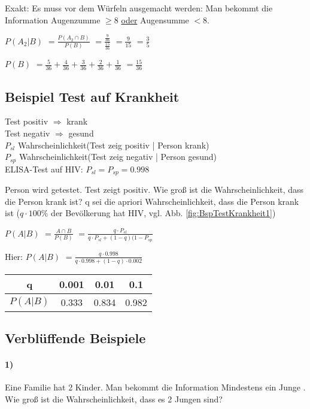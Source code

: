 Exakt: Es muss vor dem Würfeln ausgemacht werden: Man bekommt die Information Augenzumme $\geq 8$ \underline{oder} Augensumme $< 8$. 

$P(A_2|B)$
$=\frac{P(A_2\cap B)}{P(B)}$
$=\frac{\frac{9}{36}}{\frac{15}{36}}$
$=\frac{9}{15}$
$=\frac{3}{5}$

$P(B)$
$=\frac{5}{36} + \frac{4}{36} + \frac{3}{36} + \frac{2}{36} + \frac{1}{36} $
$=\frac{15}{36}$

\subsection{Beispiel Test auf Krankheit}
Test positiv $\Rightarrow$ krank\\
Test negativ $\Rightarrow$ gesund\\
$P_{sl}$ Wahrscheinlichkeit(Test zeig positiv | Person krank)\\
$P_{sp}$ Wahrscheinlichkeit(Test zeig negativ | Person gesund)\\

ELISA-Test auf HIV: $P_{sl} = P_{sp} = 0.998$

Person wird getestet. Test zeigt positiv. Wie groß ist die Wahrscheinlichkeit, dass die Person krank ist? q sei die apriori Wahrscheinlichkeit, dass die Person krank ist ($q \cdot 100 \%$ der Bevölkerung hat HIV, vgl. Abb. \ref{fig:BspTestKrankheit1})

$P(A|B)$
$=\frac{A\cap B}{P(B)}$
$=\frac{q \cdot P_{sl}}{q \cdot P_{sl} + (1-q) (1 - P_{sp}}$

Hier: 
$P(A|B)$
$=\frac{q \cdot 0.998}{q \cdot 0.998 + (1-q) \cdot 0.002}$

\begin{tabular}{|c|c|c|c|}
\hline q & 0.001 & 0.01 & 0.1 \\ 
\hline $P(A|B)$ & 0.333 & 0.834 & 0.982 \\ 
\hline 
\end{tabular} 

\subsection{Verblüffende Beispiele}

\paragraph{1)}
Eine Familie hat 2 Kinder. Man bekommt die Information \glqq Mindestens ein Junge \grqq. Wie groß ist die Wahrscheinlichkeit, dass es 2 Jungen sind?

